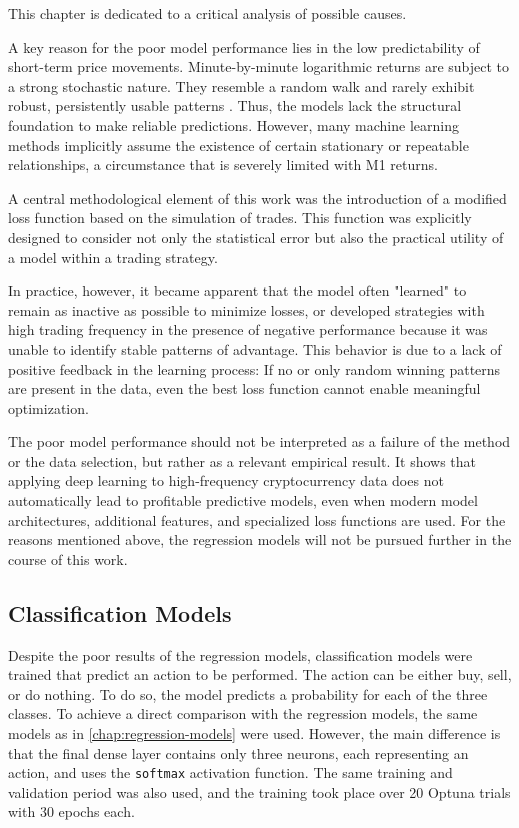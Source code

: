 This chapter is dedicated to a critical analysis of possible causes.

A key reason for the poor model performance lies in the low predictability of short-term price movements.
Minute-by-minute logarithmic returns are subject to a strong stochastic nature.
They resemble a random walk and rarely exhibit robust, persistently usable patterns \cite{random-walk}.
Thus, the models lack the structural foundation to make reliable predictions.
However, many machine learning methods implicitly assume the existence of certain stationary or repeatable relationships, a circumstance that is severely limited with M1 returns.

A central methodological element of this work was the introduction of a modified loss function based on the simulation of trades.
This function was explicitly designed to consider not only the statistical error but also the practical utility of a model within a trading strategy.

In practice, however, it became apparent that the model often "learned" to remain as inactive as possible to minimize losses, or developed strategies with high trading frequency in the presence of negative performance because it was unable to identify stable patterns of advantage.
This behavior is due to a lack of positive feedback in the learning process: If no or only random winning patterns are present in the data, even the best loss function cannot enable meaningful optimization.

The poor model performance should not be interpreted as a failure of the method or the data selection, but rather as a relevant empirical result.
It shows that applying deep learning to high-frequency cryptocurrency data does not automatically lead to profitable predictive models, even when modern model architectures, additional features, and specialized loss functions are used.
For the reasons mentioned above, the regression models will not be pursued further in the course of this work.

\subsection{Classification Models}
\label{chap:classification-models}

Despite the poor results of the regression models, classification models were trained that predict an action to be performed.
The action can be either buy, sell, or do nothing.
To do so, the model predicts a probability for each of the three classes.
To achieve a direct comparison with the regression models, the same models as in \autoref{chap:regression-models} were used.
However, the main difference is that the final dense layer contains only three neurons, each representing an action, and uses the \texttt{softmax} activation function.
The same training and validation period was also used, and the training took place over 20 Optuna trials with 30 epochs each.

